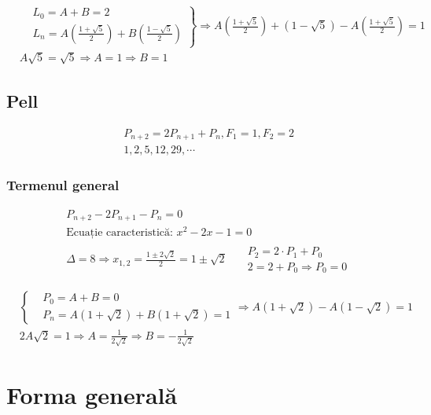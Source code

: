 \documentclass[12pt]{article}
\theoremstyle{definition}
\begin{document}
		\[\begin{aligned}
			&\left.
				\begin{aligned}
					&L_0=A+B=2\\
					&L_n= A\left(\frac{1+\sqrt{5}}{2}\right)
       						+ B\left(\frac{1-\sqrt{5}}{2}\right)
				\end{aligned}
			\right\}
			\Rightarrow
			A\left(\frac{1+\sqrt{5}}{2}\right)+(1-\sqrt{5}) - A\left(\frac{1+\sqrt{5}}{2}\right)=1\\
			&A\sqrt{5}=\sqrt{5} \Rightarrow A=1 \Rightarrow B=1
		\end{aligned}\]
		
		\subsection*{Pell}
		\[\begin{aligned}
			&P_{n+2}=2P_{n+1}+P_n, F_1=1, F_2=2\\
			&1,2,5,12,29,\cdots
		\end{aligned}\]
		\subsubsection*{Termenul general}
		\[\begin{aligned}
			&P_{n+2}-2P_{n+1}-P_n = 0\\
			&\text{Ecuație caracteristică: }x^2-2x-1=0 \\
		&\Delta = 8 \Rightarrow x_{1,2} = \frac{1 \pm 2\sqrt{2}}{2}=1\pm\sqrt{2}
			\ \ \ \begin{aligned}
				&P_2 = 2 \cdot P_1 + P_0\\
				&2 = 2 + P_0 \Rightarrow P_0=0
			\end{aligned}
		\end{aligned}\]

		\[\begin{aligned}
			&\left\{
				\begin{aligned}
					&P_0=A+B=0\\
					&P_n= A(1+\sqrt{2})+B(1+\sqrt{2})=1 
				\end{aligned}
			\right.
			\Rightarrow
			A(1+\sqrt{2})-A(1-\sqrt{2})=1\\
			&2A\sqrt{2}=1 \Rightarrow A=\frac{1}{2\sqrt{2}} \Rightarrow B=-\frac{1}{2\sqrt{2}}
		\end{aligned}\]
		\section*{Forma generală}
\end{document}
